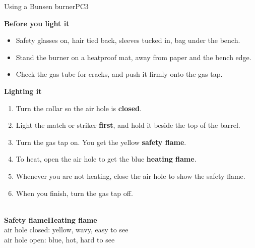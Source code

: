 
\begin{technique}{Using a Bunsen burner}{PC3}
\begin{minipage}[c]{0.62\linewidth}
\textbf{Before you light it}
\begin{itemize}[leftmargin=1.2em, itemsep=0pt, topsep=1pt]
  \item Safety glasses on, hair tied back, sleeves tucked in, bag under the bench.
  \item Stand the burner on a heatproof mat, away from paper and the bench edge.
  \item Check the gas tube for cracks, and push it firmly onto the gas tap.
\end{itemize}
\smallskip
\textbf{Lighting it}
\begin{enumerate}[leftmargin=1.6em, itemsep=0pt, topsep=1pt]
  \item Turn the collar so the air hole is \textbf{closed}.
  \item Light the match or striker \textbf{first}, and hold it beside the top of the barrel.
  \item Turn the gas tap on. You get the yellow \textbf{safety flame}.
  \item To heat, open the air hole to get the blue \textbf{heating flame}.
  \item Whenever you are not heating, close the air hole to show the safety flame.
  \item When you finish, turn the gas tap off.
\end{enumerate}
\end{minipage}\hfill
\begin{minipage}[c]{0.34\linewidth}\centering
{}\hspace{0.5cm}\\[3pt]
{\footnotesize\textbf{Safety flame}\hspace{0.6cm}\textbf{Heating flame}}\\[2pt]
{\scriptsize air hole closed: yellow, wavy, easy to see\\[1pt] air hole open: blue, hot, hard to see}
\end{minipage}
\end{technique}

